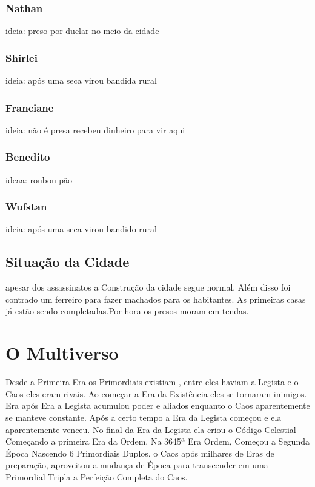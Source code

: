 \subsection{Nathan}
ideia: preso por duelar no meio da cidade
\subsection{Shirlei}
ideia: após uma seca virou bandida rural 
\subsection{Franciane}
ideia: não é presa recebeu dinheiro para vir aqui
\subsection{Benedito}
ideaa: roubou pão
\subsection{Wufstan}
ideia: após uma seca virou bandido rural 
\section{Situação da Cidade}
apesar dos assassinatos a Construção da cidade segue normal.
Além disso foi contrado um ferreiro para fazer machados para os habitantes.
As primeiras casas já estão sendo completadas.Por hora os presos moram em tendas.

\chapter{O Multiverso}
Desde a Primeira Era os Primordiais existiam , entre eles haviam a Legista e o Caos eles eram rivais.
Ao começar a Era da Existência eles se tornaram inimigos.
Era após Era a Legista acumulou poder e aliados enquanto o Caos aparentemente se manteve constante.
Após a certo tempo a Era da Legista começou e ela aparentemente venceu. 
No final da Era da Legista ela criou o Código Celestial Começando a primeira Era da Ordem.
Na 3645ª Era Ordem, Começou a Segunda Época Nascendo 6 Primordiais Duplos. 
o Caos após milhares de Eras de preparação, aproveitou a mudança de Época para
transcender em uma Primordial Tripla a Perfeição Completa do Caos.

